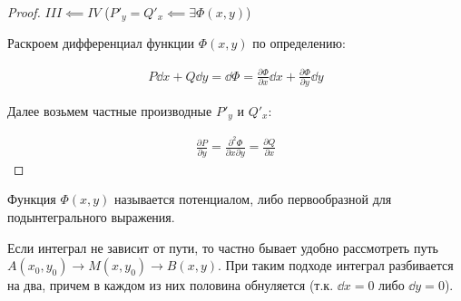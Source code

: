 \begin{proof}
  \(III \impliedby IV\) (\(P'_{y} = Q'_{x} \impliedby \exists \Phi(x, y)\))

  Раскроем дифференциал функции \(\Phi(x, y)\) по определению:

  \begin{align*}
    P \dd x + Q \dd y
    = \dd \Phi
    = \frac{\partial \Phi}{\partial x} \dd x
      + \frac{\partial \Phi}{\partial y} \dd y
  \end{align*}

  Далее возьмем частные производные \(P'_{y}\) и \(Q'_{x}\):

  \begin{align*}
    \frac{\partial P}{\partial y}
      = \frac{\partial^2 \Phi}{\partial x \partial y} 
      = \frac{\partial Q}{\partial x}
  \end{align*}
\end{proof}

\begin{remark}
  Функция \(\Phi(x, y)\) называется потенциалом, либо первообразной для
  подынтегрального выражения.
\end{remark}

\begin{multicols}{2}
  
  \columnbreak

  \begin{remark}
    Если интеграл не зависит от пути, то частно бывает удобно рассмотреть путь
    \(A(x_{0}, y_{0}) \to M(x, y_{0}) \to B(x, y)\). При таким подходе интеграл
    разбивается на два, причем в каждом из них половина обнуляется (т.к.
    \(\dd x = 0\) либо \(\dd y = 0\)).
  \end{remark}
\end{multicols}



